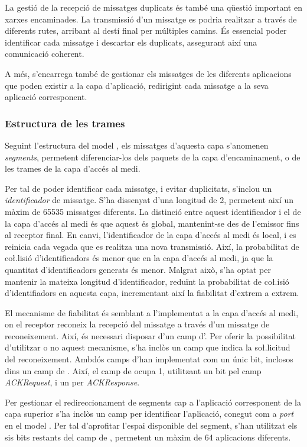 \documentclass{tfgitic}[2024/07/01]
\begin{document}
{La gestió de la recepció de missatges duplicats és també una qüestió important en xarxes encaminades. La transmissió d'un missatge es podria realitzar a través de diferents rutes, arribant al destí final per múltiples camins. És essencial poder identificar cada missatge i descartar els duplicats, assegurant així una comunicació coherent. 

A més, s'encarrega també de gestionar els missatges de les diferents aplicacions que poden existir a la capa d'aplicació, redirigint cada missatge a la seva aplicació corresponent.


\subsubsection{Estructura de les trames}
Seguint l'estructura del model , els missatges d'aquesta capa s'anomenen \emph{segments}, permetent diferenciar-los dels paquets de la capa d'encaminament, o de les trames de la capa d'accés al medi. 

Per tal de poder identificar cada missatge, i evitar duplicitats, s'inclou un \emph{identificador} de missatge. S'ha dissenyat d'una longitud de \SI{2}{\byte}, permetent així un màxim de \num{65535} missatges diferents. La distinció entre aquest identificador i el de la capa d'accés al medi és que aquest és global, mantenint-se des de l'emissor fins al receptor final. En canvi, l'identificador de la capa d'accés al medi és local, i es reinicia cada vegada que es realitza una nova transmissió. Així, la probabilitat de co\l.lisió d'identificadors és menor que en la capa d'accés al medi, ja que la quantitat d'identificadors generats és menor. Malgrat això, s'ha optat per mantenir la mateixa longitud d'identificador, reduïnt la probabilitat de co\l.isió d'identifiadors en aquesta capa, incrementant així la fiabilitat d'extrem a extrem. 

El mecanisme de fiabilitat és semblant a l'implementat a la capa d'accés al medi, on el receptor reconeix la recepció del missatge a través d'un missatge de reconeixement. Així, és necessari disposar d'un camp d'. Per oferir la possibilitat d'utilitzar o no aquest mecanisme, s'ha inclòs un camp que indica la so\l.licitud del reconeixement. Ambdós camps d'han implementat com un únic bit, inclosos dins un camp de . Així, el camp de  ocupa \SI{1}{\byte}, utilitzant un bit pel camp \emph{ACKRequest}, i un per \emph{ACKResponse}.

Per gestionar el redireccionament de segments cap a l'aplicació corresponent de la capa superior s'ha inclòs un camp per identificar l'aplicació, conegut com a \emph{port} en el model . Per tal d'aprofitar l'espai disponible del segment, s'han utilitzat els sis bits restants del camp de , permetent un màxim de 64 aplicacions diferents. 

}
\end{document}
